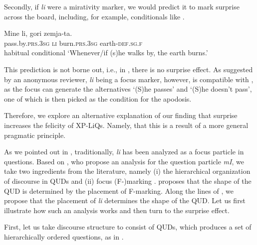 \documentclass[output=paper,
colorlinks,
citecolor=brown,
newtxmath
]{langscibook}
\begin{document}
Secondly, if \textit{li} were a mirativity marker, we would predict it to mark surprise across the board, including, for example, conditionals like .


\ea \gll Mine li, gori zemja-ta. \\
pass.by.\textsc{prs.3sg} \textsc{li} burn.\textsc{prs.3sg} earth-\textsc{def.sg.f} \\ \hfill habitual conditional
\glt `Whenever/if (s)he walks by, the earth burns.'\hfill \citep[539]{koneski1987}\label{nosurprise}
\z

\noindent
This prediction is not borne out, i.e., in , there is no surprise effect. As suggested by an anonymous reviewer, \textit{li} being a focus marker, however, is compatible with ,
as the focus can generate the alternatives `(S)he passes' and `(S)he doesn't pass', one of which is then picked as the condition for the apodosis.

Therefore, we explore an alternative explanation of our finding that surprise increases the felicity of XP-LiQs. Namely, that this is a result of a more general pragmatic principle.

As we pointed out in , traditionally, \textit{li} has been analyzed as a focus particle in questions. Based on \citet{Meertens.Egger.Romero2018}, who propose an analysis for the  question particle \textit{mI}, we take two ingredients from the literature, namely (i) the hierarchical organization of discourse in QUDs  \citep{Roberts2012,Buering2003} and (ii) focus (F-)marking \citep{rooth1992}. \citet{Roberts2012} proposes that the shape of the QUD is determined by the placement of F-marking. Along the lines of \citet{Meertens.Egger.Romero2018}, we propose that the placement of \textit{li} determines the shape of the QUD. Let us first illustrate how such an analysis works and then turn to the surprise effect.

First, let us take discourse structure to consist of QUDs, which produces a set of hierarchically ordered questions, as in .


\end{document}
